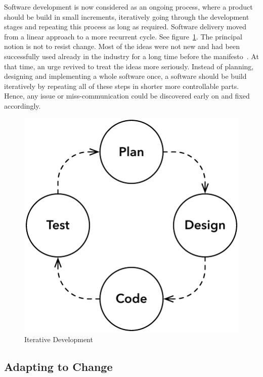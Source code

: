 \documentclass[english]{tktltiki2}
\begin{document}
Software development is now considered as an ongoing process, where a product should be build in small increments, iteratively going through the development stages and repeating this process as long as required. Software delivery moved from a linear approach to a more recurrent cycle. See figure~\ref{figure:iterative-development}. The principal notion is not to resist change. Most of the ideas were not new and had been successfully used already in the industry for a long time before the manifesto~\cite{Fow05}. At that time, an urge revived to treat the ideas more seriously. Instead of planning, designing and implementing a whole software once, a software should be build iteratively by repeating all of these steps in shorter more controllable parts. Hence, any issue or miss-communication could be discovered early on and fixed accordingly.

\begin{figure}[h!]

    \centering
    \vspace{1cm}

    \includegraphics[scale = 0.6]{figures/iterative-development}

    \caption{Iterative Development}
    \label{figure:iterative-development}

\end{figure}

\subsection{Adapting to Change}
\end{document}
